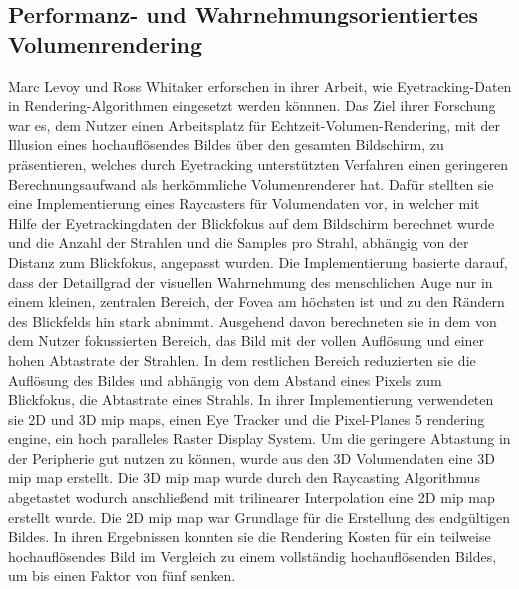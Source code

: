 \subsection{Performanz- und Wahrnehmungsorientiertes Volumenrendering}\label{ss::pfwov}
Marc Levoy und Ross Whitaker \cite{Levoy:1990:GVR:91385.91449} erforschen in ihrer Arbeit, wie Eyetracking-Daten in Rendering-Algorithmen eingesetzt werden könnnen.
Das Ziel ihrer Forschung war es, dem Nutzer einen Arbeitsplatz für Echtzeit-Volumen-Rendering, mit der Illusion eines hochauflösendes Bildes über den gesamten Bildschirm, zu präsentieren, welches durch Eyetracking unterstützten Verfahren einen geringeren Berechnungsaufwand als herkömmliche Volumenrenderer hat.
Dafür stellten sie eine Implementierung eines Raycasters für Volumendaten vor, in welcher mit Hilfe der Eyetrackingdaten der Blickfokus auf dem Bildschirm berechnet wurde und die Anzahl der Strahlen und die Samples pro Strahl, abhängig von der Distanz zum Blickfokus, angepasst wurden.
Die Implementierung basierte darauf, dass der Detaillgrad der visuellen Wahrnehmung des menschlichen Auge nur in einem kleinen, zentralen Bereich, der Fovea am höchsten ist und zu den Rändern des Blickfelds hin stark abnimmt.
Ausgehend davon berechneten sie in dem von dem Nutzer fokussierten Bereich, das Bild mit der vollen Auflösung und einer hohen Abtastrate der Strahlen.
In dem restlichen Bereich reduzierten sie die Auflösung des Bildes und abhängig von dem Abstand eines Pixels zum Blickfokus, die Abtastrate eines Strahls.
In ihrer Implementierung verwendeten sie 2D und 3D mip maps, einen Eye Tracker und die Pixel-Planes 5 rendering engine, ein hoch paralleles Raster Display System.
Um die geringere Abtastung in der Peripherie gut nutzen zu können, wurde aus den 3D Volumendaten eine 3D mip map erstellt.
Die 3D mip map wurde durch den Raycasting Algorithmus abgetastet wodurch anschließend mit trilinearer Interpolation eine 2D mip map erstellt wurde.
Die 2D mip map war Grundlage für die Erstellung des endgültigen Bildes.
In ihren Ergebnissen konnten sie die Rendering Kosten für ein teilweise hochauflösendes Bild im Vergleich zu einem vollständig hochauflösenden Bildes, um bis einen Faktor von fünf senken.

